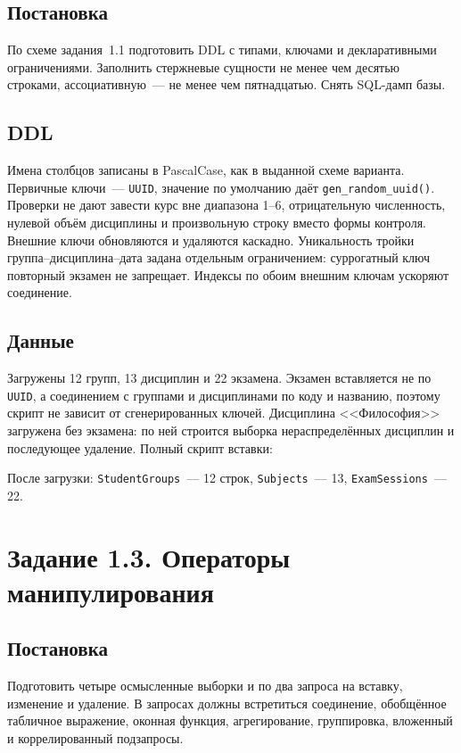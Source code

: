 \documentclass[12pt,a4paper]{article}
\begin{document}
\subsection*{Постановка}
По схеме задания~1.1 подготовить DDL с типами, ключами и декларативными ограничениями. Заполнить стержневые сущности не менее чем десятью строками, ассоциативную~--- не менее чем пятнадцатью. Снять SQL-дамп базы.

\subsection*{DDL}
Имена столбцов записаны в PascalCase, как в выданной схеме варианта. Первичные ключи~--- \texttt{UUID}, значение по умолчанию даёт \texttt{gen\_random\_uuid()}. Проверки не дают завести курс вне диапазона 1--6, отрицательную численность, нулевой объём дисциплины и произвольную строку вместо формы контроля. Внешние ключи обновляются и удаляются каскадно. Уникальность тройки группа--дисциплина--дата задана отдельным ограничением: суррогатный ключ повторный экзамен не запрещает. Индексы по обоим внешним ключам ускоряют соединение.



\subsection*{Данные}
Загружены 12 групп, 13 дисциплин и 22 экзамена. Экзамен вставляется не по \texttt{UUID}, а соединением с группами и дисциплинами по коду и названию, поэтому скрипт не зависит от сгенерированных ключей. Дисциплина <<Философия>> загружена без экзамена: по ней строится выборка нераспределённых дисциплин и последующее удаление. Полный скрипт вставки:



После загрузки: \texttt{StudentGroups}~--- 12 строк, \texttt{Subjects}~--- 13, \texttt{ExamSessions}~--- 22.

\section*{Задание 1.3. Операторы манипулирования}
\subsection*{Постановка}
Подготовить четыре осмысленные выборки и по два запроса на вставку, изменение и удаление. В запросах должны встретиться соединение, обобщённое табличное выражение, оконная функция, агрегирование, группировка, вложенный и коррелированный подзапросы.
\end{document}
